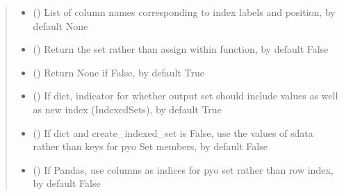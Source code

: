 \documentclass[letterpaper,10pt,english]{sphinxmanual}
\begin{document}
\begin{fulllineitems}
\begin{fulllineitems}
\begin{quote}
\begin{description}
\begin{itemize}
\item {} 
\sphinxAtStartPar
{} (\sphinxstyleliteralemphasis{\sphinxupquote{ | }}\sphinxstyleliteralemphasis{\sphinxupquote{, }}) \textendash{} List of column names corresponding to index labels and position, by default None

\item {} 
\sphinxAtStartPar
{} (\sphinxstyleliteralemphasis{\sphinxupquote{ | }}\sphinxstyleliteralemphasis{\sphinxupquote{, }}) \textendash{} Return the set rather than assign within function, by default False

\item {} 
\sphinxAtStartPar
{} (\sphinxstyleliteralemphasis{\sphinxupquote{ | }}\sphinxstyleliteralemphasis{\sphinxupquote{, }}) \textendash{} Return None if False, by default True

\item {} 
\sphinxAtStartPar
{} (\sphinxstyleliteralemphasis{\sphinxupquote{ | }}\sphinxstyleliteralemphasis{\sphinxupquote{, }}) \textendash{} If dict, indicator for whether output set should include values as well as new index (IndexedSets), by default True

\item {} 
\sphinxAtStartPar
{} (\sphinxstyleliteralemphasis{\sphinxupquote{ | }}\sphinxstyleliteralemphasis{\sphinxupquote{, }}) \textendash{} If dict and create\_indexed\_set is False, use the values of sdata rather than keys for pyo Set members, by default False

\item {} 
\sphinxAtStartPar
{} (\sphinxstyleliteralemphasis{\sphinxupquote{ | }}\sphinxstyleliteralemphasis{\sphinxupquote{, }}) \textendash{} If Pandas, use columns as indices for pyo set rather than row index, by default False


\end{itemize}
\end{description}
\end{quote}
\end{fulllineitems}
\end{fulllineitems}
\end{document}
